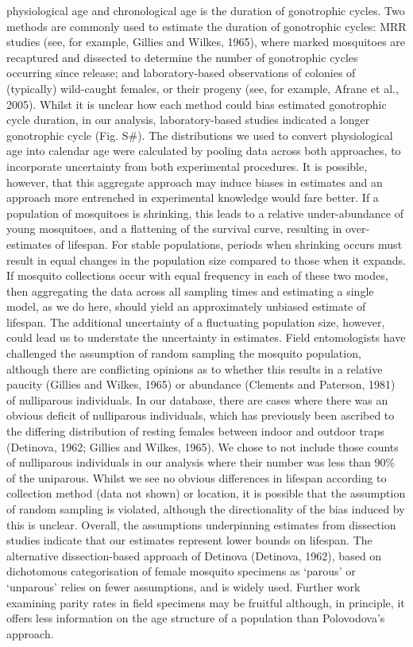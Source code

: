 \documentclass[]{article}
\begin{document}
physiological age and chronological age is the duration of gonotrophic
cycles. Two methods are commonly used to estimate the duration of
gonotrophic cycles: MRR studies (see, for example, Gillies and Wilkes,
1965), where marked mosquitoes are recaptured and dissected to determine
the number of gonotrophic cycles occurring since release; and
laboratory-based observations of colonies of (typically) wild-caught
females, or their progeny (see, for example, Afrane et al., 2005).
Whilst it is unclear how each method could bias estimated gonotrophic
cycle duration, in our analysis, laboratory-based studies indicated a
longer gonotrophic cycle (Fig. S\#). The distributions we used to
convert physiological age into calendar age were calculated by pooling
data across both approaches, to incorporate uncertainty from both
experimental procedures. It is possible, however, that this aggregate
approach may induce biases in estimates and an approach more entrenched
in experimental knowledge would fare better. If a population of
mosquitoes is shrinking, this leads to a relative under-abundance of
young mosquitoes, and a flattening of the survival curve, resulting in
over-estimates of lifespan. For stable populations, periods when
shrinking occurs must result in equal changes in the population size
compared to those when it expands. If mosquito collections occur with
equal frequency in each of these two modes, then aggregating the data
across all sampling times and estimating a single model, as we do here,
should yield an approximately unbiased estimate of lifespan. The
additional uncertainty of a fluctuating population size, however, could
lead us to understate the uncertainty in estimates. Field entomologists
have challenged the assumption of random sampling the mosquito
population, although there are conflicting opinions as to whether this
results in a relative paucity (Gillies and Wilkes, 1965) or abundance
(Clements and Paterson, 1981) of nulliparous individuals. In our
database, there are cases where there was an obvious deficit of
nulliparous individuals, which has previously been ascribed to the
differing distribution of resting females between indoor and outdoor
traps (Detinova, 1962; Gillies and Wilkes, 1965). We chose to not
include those counts of nulliparous individuals in our analysis where
their number was less than 90\% of the uniparous. Whilst we see no
obvious differences in lifespan according to collection method (data not
shown) or location, it is possible that the assumption of random
sampling is violated, although the directionality of the bias induced by
this is unclear. Overall, the assumptions underpinning estimates from
dissection studies indicate that our estimates represent lower bounds on
lifespan. The alternative dissection-based approach of Detinova
(Detinova, 1962), based on dichotomous categorisation of female mosquito
specimens as `parous' or `unparous' relies on fewer assumptions, and is
widely used. Further work examining parity rates in field specimens may
be fruitful although, in principle, it offers less information on the
age structure of a population than Polovodova's approach.
\end{document}
